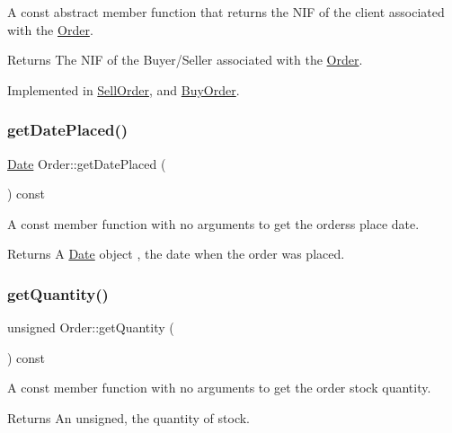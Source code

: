 A const abstract member function that returns the N\+IF of the client associated with the \hyperlink{class_order}{Order}. \begin{DoxyReturn}{Returns}
The N\+IF of the Buyer/\+Seller associated with the \hyperlink{class_order}{Order}. 
\end{DoxyReturn}


Implemented in \hyperlink{class_sell_order_a2f34e30d8bc5c891c40d8b80342cc34d}{Sell\+Order}, and \hyperlink{class_buy_order_ab79597b9bf0656216b2283bfa3a650e0}{Buy\+Order}.

\hypertarget{class_order_a8ffb9095f78f8a3b1942e7995516007c}{}\label{class_order_a8ffb9095f78f8a3b1942e7995516007c} 
\subsubsection{\texorpdfstring{get\+Date\+Placed()}{getDatePlaced()}}
{\footnotesize\ttfamily \hyperlink{class_date}{Date} Order\+::get\+Date\+Placed (\begin{DoxyParamCaption}{ }\end{DoxyParamCaption}) const}

A const member function with no arguments to get the orders\textquotesingle{}s place date. \begin{DoxyReturn}{Returns}
A \hyperlink{class_date}{Date} object , the date when the order was placed. 
\end{DoxyReturn}
\hypertarget{class_order_a1d34436da1dbc3ffad588505eca5ff49}{}\label{class_order_a1d34436da1dbc3ffad588505eca5ff49} 
\subsubsection{\texorpdfstring{get\+Quantity()}{getQuantity()}}
{\footnotesize\ttfamily unsigned Order\+::get\+Quantity (\begin{DoxyParamCaption}{ }\end{DoxyParamCaption}) const}

A const member function with no arguments to get the order stock quantity. \begin{DoxyReturn}{Returns}
An unsigned, the quantity of stock. 
\end{DoxyReturn}
\hypertarget{class_order_aa008956fd77ac3d254117443b7d916fa}{}\label{class_order_aa008956fd77ac3d254117443b7d916fa} 
